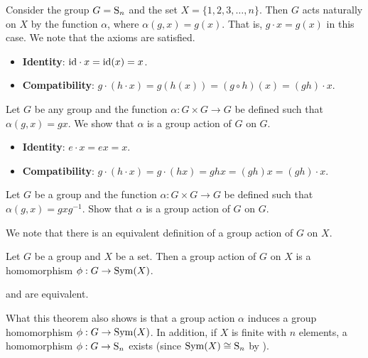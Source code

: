 \begin{example}
    Consider the group $G = \mathrm{S}_{n}$ and the set $X = \{1, 2, 3, \dots, n\}$. Then $G$ acts naturally on $X$ by the function $\alpha$, where $\alpha(g, x) = g(x)$. That is, $g \cdot x = g(x)$ in this case. We note that the axioms are satisfied.
    \begin{itemize}
        \item \textbf{Identity}: $\mathrm{id} \cdot x = \mathrm{id}(x) = x$.
        \item \textbf{Compatibility}: $g \cdot (h \cdot x) = g(h(x)) = (g \circ h)(x) = (gh) \cdot x$.
    \end{itemize}
\end{example}

\begin{example}
    Let $G$ be any group and the function $\alpha: G\times G \to G$ be defined such that $\alpha(g, x) = gx$. We show that $\alpha$ is a group action of $G$ on $G$.
    \begin{itemize}
        \item \textbf{Identity}: $e\cdot x = ex = x$.
        \item \textbf{Compatibility}: $g \cdot (h\cdot x) = g \cdot (hx) = ghx = (gh)x = (gh) \cdot x$.
    \end{itemize}
\end{example}

\begin{exercise}\label{exercise-conjugacy-is-group-action}
    Let $G$ be a group and the function $\alpha: G\times G \to G$ be defined such that $\alpha(g, x) = gxg^{-1}$. Show that $\alpha$ is a group action of $G$ on $G$.
\end{exercise}

We note that there is an equivalent definition of a group action of $G$ on $X$.
\begin{definition}\label{definition-group-action-alt}
    Let $G$ be a group and $X$ be a set. Then a group action of $G$ on $X$ is a homomorphism $\phi: G\to \mathrm{Sym}(X)$.
\end{definition}
\begin{theorem}\label{thrm-group-action-definition-equivalence}
     and  are equivalent.
\end{theorem}
\begin{remark}
    What this theorem also shows is that a group action $\alpha$ induces a group homomorphism $\phi: G \to \mathrm{Sym}(X)$. In addition, if $X$ is finite with $n$ elements, a homomorphism $\phi: G \to \mathrm{S}_{n}$ exists (since $\mathrm{Sym}(X) \cong \mathrm{S}_{n}$ by ).
\end{remark}


